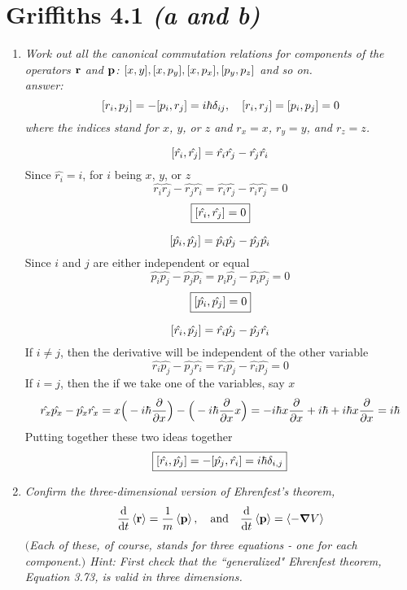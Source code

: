 \documentclass[12pt]{article}
\begin{document}
\section*{Griffiths 4.1 \emph{(a and b)}}
\begin{enumerate}[label=\alph*)]
\item \emph{Work out all the canonical commutation relations for components of the operators $\vb{r}$ and $\vb{p}$: $\comm{x}{y}, \comm{x}{p_y}, \comm{x}{p_x}, \comm{p_y}{p_z}$ and so on.}\\
\emph{answer:}
\[\comm{r_i}{p_j} = -\comm{p_i}{r_j} = i\hbar \delta_{ij}, \quad \comm{r_i}{r_j}=\comm{p_i}{p_j}=0\]
\emph{where the indices stand for $x$, $y$, or $z$ and $r_x = x$, $r_y=y$, and $r_z = z$.}\bigskip

\[\comm{\hat{r_i}}{\hat{r_j}} = \hat{r_i}\hat{r_j} - \hat{r_j}\hat{r_i}\]
Since $\hat{r_i} = i$, for $i$ being $x$, $y$, or $z$
\[\hat{r_i}\hat{r_j} - \hat{r_j}\hat{r_i} = \hat{r_i}\hat{r_j} - \hat{r_i}\hat{r_j} = 0\]
\[\boxed{\comm{\hat{r_i}}{\hat{r_j}} = 0}\]

\[\comm{\hat{p_i}}{\hat{p_j}} = \hat{p_i}\hat{p_j} - \hat{p_j}\hat{p_i}\]
Since $i$ and $j$ are either independent or equal
\[\hat{p_i}\hat{p_j} - \hat{p_j}\hat{p_i} = \hat{p_i}\hat{p_j} - \hat{p_i}\hat{p_j} = 0\]
\[\boxed{\comm{\hat{p_i}}{\hat{p_j}} = 0}\]

\[\comm{\hat{r_i}}{\hat{p_j}} = \hat{r_i}\hat{p_j} - \hat{p_j}\hat{r_i}\]
If $i \neq j$, then the derivative will be independent of the other variable
\[\hat{r_i}\hat{p_j} - \hat{p_j}\hat{r_i} = \hat{r_i}\hat{p_j} - \hat{r_i}\hat{p_j} = 0\]
If $i = j$, then the if we take one of the variables, say $x$
\[\hat{r_x}\hat{p_x} - \hat{p_x}\hat{r_x} = x\Big(-i \hbar \pdv{x}\Big) - \Big(-i \hbar \pdv{x}x\Big) = -i \hbar x\pdv{x} + i\hbar + i \hbar x \pdv{x} = i \hbar\]
Putting together these two ideas together
\[\boxed{\comm{\hat{r_i}}{\hat{p_j}} = - \comm{\hat{p_j}}{\hat{r_i}}= i \hbar \delta_{i,j}}\]


\item \emph{Confirm the three-dimensional version of Ehrenfest's theorem, }
\[\dv{t}\ev{\vb{r}} = \frac{1}{m}\ev{\vb{p}}, \quad \text{and} \quad \dv{t}\ev{\vb{p}} = \ev{-\grad{V}}\]
\emph{$($Each of these, of course, stands for three equations - one for each component.$)$ Hint: First check that the ``generalized" Ehrenfest theorem, Equation 3.73, is valid in three dimensions.}\bigskip


\end{enumerate}
\end{document}
